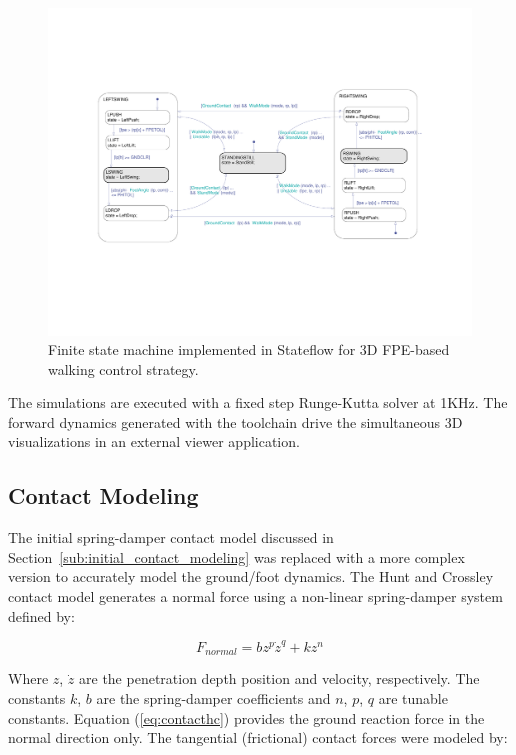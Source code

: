 \begin{figure}[!h]
	\centering
    \includegraphics[trim = 30mm 60mm 25mm 53mm,clip,width=17cm]{fig/simulations/statemachine.pdf} 
  	\caption{Finite state machine implemented in Stateflow for 3D FPE-based walking control strategy.}
	\label{fig:stateflow}
\end{figure}

The simulations are executed with a fixed step Runge-Kutta solver at 1KHz. The forward dynamics generated with the toolchain drive the simultaneous 3D visualizations in an external viewer application.  

\subsection{Contact Modeling} %
\label{sub:full_contact_modeling}
The initial spring-damper contact model discussed in Section~\ref{sub:initial_contact_modeling} was replaced with a more complex version to accurately model the ground/foot dynamics. The Hunt and Crossley contact model \cite{hunt1975coefficient,gilardi2002literature} generates a normal force using a non-linear spring-damper system defined by: 

\begin{equation}
	\label{eq:contacthc}
	{F_{normal}} = b{z^p}{\dot z^q} + k{z^n}
\end{equation}

Where $z$, $\dot{z}$ are the penetration depth position and velocity, respectively. The constants $k$, $b$ are the spring-damper coefficients and $n$, $p$, $q$ are tunable constants. Equation (\ref{eq:contacthc}) provides the ground reaction force in the normal direction only. The tangential (frictional) contact forces were modeled by: 


